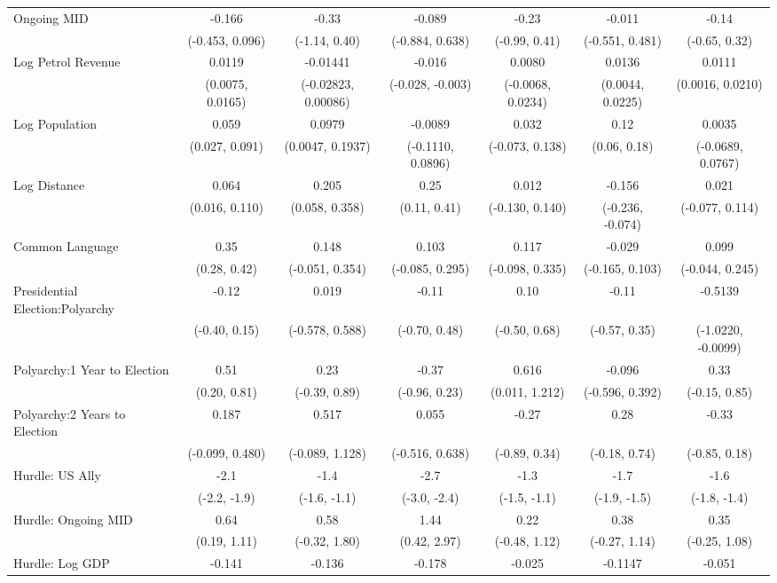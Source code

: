 \begin{table}[H]
\begin{tabular}[t]{lcccccc}
Ongoing MID & -0.166 & -0.33 & -0.089 & -0.23 & -0.011 & -0.14\\
 & (-0.453, 0.096) & (-1.14, 0.40) & (-0.884, 0.638) & (-0.99, 0.41) & (-0.551, 0.481) & (-0.65, 0.32)\\
Log Petrol Revenue & 0.0119 & -0.01441 & -0.016 & 0.0080 & 0.0136 & 0.0111\\
 & (0.0075, 0.0165) & (-0.02823, 0.00086) & (-0.028, -0.003) & (-0.0068, 0.0234) & (0.0044, 0.0225) & (0.0016, 0.0210)\\
Log Population & 0.059 & 0.0979 & -0.0089 & 0.032 & 0.12 & 0.0035\\
 & (0.027, 0.091) & (0.0047, 0.1937) & (-0.1110, 0.0896) & (-0.073, 0.138) & (0.06, 0.18) & (-0.0689, 0.0767)\\
Log Distance & 0.064 & 0.205 & 0.25 & 0.012 & -0.156 & 0.021\\
 & (0.016, 0.110) & (0.058, 0.358) & (0.11, 0.41) & (-0.130, 0.140) & (-0.236, -0.074) & (-0.077, 0.114)\\
Common Language & 0.35 & 0.148 & 0.103 & 0.117 & -0.029 & 0.099\\
 & (0.28, 0.42) & (-0.051, 0.354) & (-0.085, 0.295) & (-0.098, 0.335) & (-0.165, 0.103) & (-0.044, 0.245)\\
Presidential Election:Polyarchy & -0.12 & 0.019 & -0.11 & 0.10 & -0.11 & -0.5139\\
 & (-0.40, 0.15) & (-0.578, 0.588) & (-0.70, 0.48) & (-0.50, 0.68) & (-0.57, 0.35) & (-1.0220, -0.0099)\\
Polyarchy:1 Year to Election & 0.51 & 0.23 & -0.37 & 0.616 & -0.096 & 0.33\\
 & (0.20, 0.81) & (-0.39, 0.89) & (-0.96, 0.23) & (0.011, 1.212) & (-0.596, 0.392) & (-0.15, 0.85)\\
Polyarchy:2 Years to Election & 0.187 & 0.517 & 0.055 & -0.27 & 0.28 & -0.33\\
 & (-0.099, 0.480) & (-0.089, 1.128) & (-0.516, 0.638) & (-0.89, 0.34) & (-0.18, 0.74) & (-0.85, 0.18)\\
Hurdle: US Ally & -2.1 & -1.4 & -2.7 & -1.3 & -1.7 & -1.6\\
 & (-2.2, -1.9) & (-1.6, -1.1) & (-3.0, -2.4) & (-1.5, -1.1) & (-1.9, -1.5) & (-1.8, -1.4)\\
Hurdle: Ongoing MID & 0.64 & 0.58 & 1.44 & 0.22 & 0.38 & 0.35\\
 & (0.19, 1.11) & (-0.32, 1.80) & (0.42, 2.97) & (-0.48, 1.12) & (-0.27, 1.14) & (-0.25, 1.08)\\
Hurdle: Log GDP & -0.141 & -0.136 & -0.178 & -0.025 & -0.1147 & -0.051\\

\end{tabular}
\end{table}
